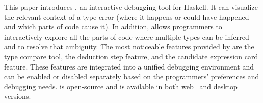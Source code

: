 This paper introduces \chameleon{}, an interactive debugging tool for Haskell. It can visualize the relevant context of a type error (where it happens or could have happened and which parts of code cause it). In addition, \chameleon{} allows programmers to interactively explore all the parts of code where multiple types can be inferred and to resolve that ambiguity. The most noticeable features provided by \chameleon{} are the type compare tool, the deduction step feature, and the candidate expression card feature. These features are integrated into a unified debugging environment and can be enabled or disabled separately based on the programmers' preferences and debugging needs. \chameleon{} is open-source and is available in both web~\cite{shuai_fu_chameleon_2022} and desktop versions.  




